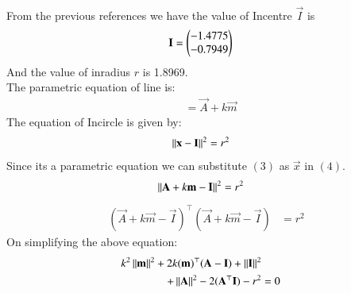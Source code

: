 \documentclass[journal,12pt,twocolumn]{IEEEtran}
\theoremstyle{remark}
\begin{document}
\solution\\
From the previous references we have the value of Incentre $\vec{I}$ is
\begin{align}
\mathbf{I} &=\begin{pmatrix}-1.4775\\-0.7949\end{pmatrix}
\end{align}
And the value of inradius $r$ is 1.8969.\\
The parametric equation of line is:
\begin{align}
&= \vec{A}+k\vec{m}
\end{align}
The equation of Incircle is given by:
\begin{align}
\left\lVert\mathbf{x}-\mathbf{I}\right\rVert^2 &= r^2
\end{align}
Since its a parametric equation we can substitute $(3)$ as $\vec{x}$ in $(4)$.
\begin{align}
\left\lVert\mathbf{A}+k\mathbf{m}-\mathbf{I}\right\rVert^2 &= r^2
\end{align}
\begin{align}
(\vec{A}+k\vec{m}-\vec{I})^\top(\vec{A}+k\vec{m}-\vec{I}) &= r^2
\end{align}
On simplifying the above equation:
\begin{align}
k^2\left\lVert\mathbf{m}\right\rVert^2+2k(\mathbf{m})^\top(\mathbf{A-I})+\left\lVert\mathbf{I}\right\rVert^2 \nonumber \\
+\left\lVert\mathbf{A}\right\rVert^2-2(\mathbf{A}^\top\mathbf{I})-r^2 &= 0
\end{align}
\end{document}
